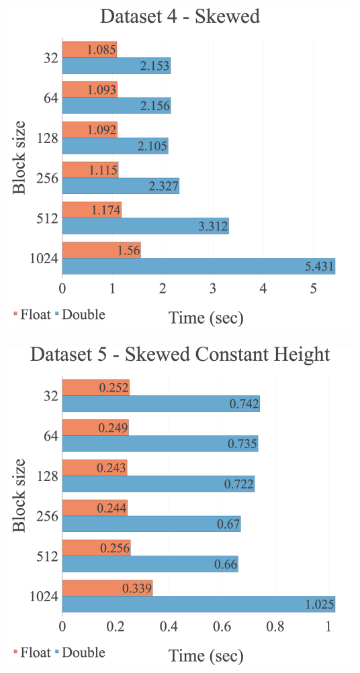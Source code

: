 \begin{figure}[H]
\begin{adjustwidth}{-2cm}{-2cm}
\begin{subfigure}{.62\textwidth}
  \centering
  \includegraphics[width=1\textwidth]{img/experiments/option-blocks-4_SKEWED.png}
\end{subfigure}
\begin{subfigure}{.62\textwidth}
  \centering
  \includegraphics[width=1\textwidth]{img/experiments/option-blocks-5_SKEWEDCONSTHEIGHT.png}

\end{subfigure}
\end{adjustwidth}
\end{figure}
